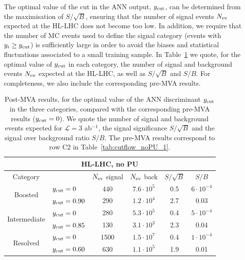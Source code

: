 %
The optimal value of the cut in the
ANN output, $y_{\rm cut}$,  can be determined from the maximisation of $S/\sqrt{B}$,
ensuring that the number of signal events $N_{\rm ev}$
expected at the HL-LHC does not become too low.
%
In  addition, we require
that the number of MC events used to define the signal
category (events with $y_i \ge y_{\rm cut}$)
is sufficiently large in order to avoid the biases and statistical
fluctuations associated to a small training sample.
%
In Table~\ref{table:cutflowMVA} we quote, for the optimal
value of $y_{\rm cut}$
in each category,
the number of signal and background events $N_{\rm ev}$ expected
at the HL-LHC, as well as $S/\sqrt{B}$ and $S/B$.
%
For completeness, we also include the corresponding
pre-MVA results.
%

\begin{table}[t]
  \centering
  \begin{tabular}{|c|l|c|c|c|c|}
    \hline
    \multicolumn{6}{|c|}{HL-LHC, no PU} \\
    \hline
    \hline
    Category  &   &  $N_{\rm ev}$ signal &  $N_{\rm ev}$ back  &  $S/\sqrt{B}$ & $S/B$ \\ 
    \hline
    \hline
    \multirow{2}{*}{Boosted} &  $y_{\rm cut}=0$  & 440 & $7.6\cdot 10^5$  & 0.5  & $6\cdot 10^{-4}$  \\
    &  $y_{\rm cut}=0.90$ & 290  & $1.2\cdot 10^4$   & 2.7  & 0.03 \\
    \hline
    \hline
    \multirow{2}{*}{Intermediate} &  $y_{\rm cut}=0$  & 280   & $5.3\cdot 10^5$
    & 0.4 & $5\cdot 10^{-4}$ \\
    &  $y_{\rm cut}=0.85$ & 130  & $3.1\cdot 10^3$  & 2.3 & 0.04\\
    \hline
    \hline
      \multirow{2}{*}{Resolved} &  $y_{\rm cut}=0$  & 1500 &  $1.5\cdot 10^{7}$ &  0.4 &$1\cdot 10^{-4}$ \\
    &  $y_{\rm cut}=0.60$ & 630  & $1.1\cdot 10^{5}$ & 1.9 & 0.01 \\
    \hline
      \end{tabular}
  \caption{\small Post-MVA results, for the optimal value of the
    ANN discriminant $y_{\rm cut}$ in the three categories, compared with the
    corresponding
    pre-MVA results ($y_{\rm cut}=0$).
    We quote the number of signal and
    background events expected for $\mathcal{L}=3$ ab$^{-1}$,
    the signal significance $S/\sqrt{B}$ and
    the signal over background ratio $S/B$.
    The pre-MVA results correspond to row C2 in
    Table~\ref{tab:cutflow_noPU_1}.
    \label{table:cutflowMVA}
  }
\end{table}

